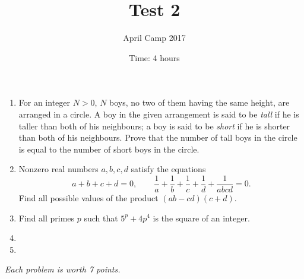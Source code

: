 \documentclass[a4paper,12pt]{article}
\title{Test 2}
\date{Time: 4 hours}
\author{April Camp 2017}
\begin{document}
 \maketitle

\begin{enumerate}
	\item %
	For an integer $N>0$, $N$ boys, no two of them having the same height, are arranged in a circle. A boy in the given arrangement is said to be \emph{tall} if he is taller than both of his neighbours; a boy is said to be \emph{short} if he is shorter than both of his neighbours. Prove that the number of tall boys in the circle is equal to the number of short boys in the circle.
	
	\item %
	Nonzero real numbers $a,b,c,d$ satisfy the equations \[a+b+c+d = 0, \qquad \frac{1}{a}+\frac{1}{b}+\frac{1}{c}+\frac{1}{d}+\frac{1}{abcd} = 0.\]
	Find all possible values of the product $(ab-cd)(c+d)$.

	\item 
	Find all primes $p$ such that $5^p +4p^4$ is the square of an integer.

	\item 

	\item

\end{enumerate}

\medskip 

\hfill \emph{Each problem is worth 7 points.}
	
\end{document}
